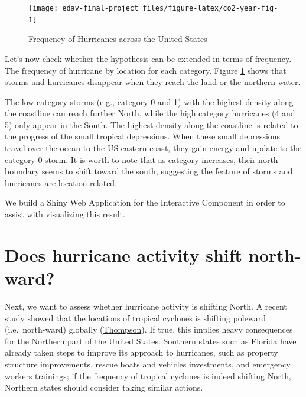 \documentclass[]{book}
\begin{document}
\begin{figure}

{\centering \texttt{[image: edav-final-project\_files/figure-latex/co2-year-fig-1]} 

}

\caption{Frequency of Hurricanes across the United States}\label{fig:co2-year-fig}
\end{figure}

Let's now check whether the hypothesis can be extended in terms of frequency. The frequency of hurricane by location for each category. Figure \ref{fig:co2-year-fig} shows that storms and hurricanes disappear when they reach the land or the northern water.

The low category storms (e.g., category 0 and 1) with the highest density along the coastline can reach further North, while the high category hurricanes (4 and 5) only appear in the South. The highest density along the coastline is related to the progress of the small tropical depressions. When these small depressions travel over the ocean to the US eastern coast, they gain energy and update to the category 0 storm. It is worth to note that as category increases, their north boundary seems to shift toward the south, suggesting the feature of storms and hurricanes are location-related.

We build a Shiny Web Application for the Interactive Component in order to assist with visualizing this result.

\hypertarget{does-hurricane-activity-shift-north-ward}{%
\section{Does hurricane activity shift north-ward?}\label{does-hurricane-activity-shift-north-ward}}

Next, we want to assess whether hurricane activity is shifting North. A recent study showed that the locations of tropical cyclones is shifting poleward (i.e.~north-ward) globally (\href{https://www.climatecentral.org/news/warming-may-shift-hurricane-impacts-17437}{Thompson}). If true, this implies heavy consequences for the Northern part of the United States. Southern states such as Florida have already taken steps to improve its approach to hurricanes, such as property structure improvements, rescue boats and vehicles investments, and emergency workers trainings; if the frequency of tropical cyclones is indeed shifting North, Northern states should consider taking similar actions.
\end{document}
